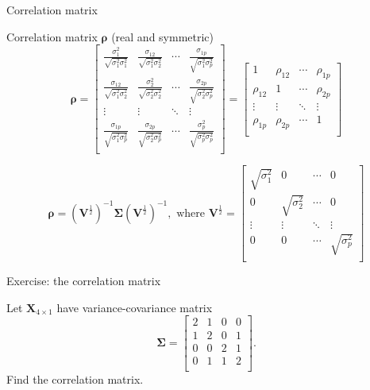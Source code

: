 \documentclass[
  ignorenonframetext,
]{beamer}
\begin{document}
\begin{frame}
\begin{block}{Correlation matrix}
\protect\hypertarget{correlation-matrix}{}
\(~\)

Correlation matrix \(\boldsymbol{\rho}\) (real and symmetric)
\[\boldsymbol{\rho}=\left[ \begin{array}{cccc}
    \frac{\sigma_{1}^2}{\sqrt{\sigma_{1}^2\sigma_{1}^2}} &
    \frac{\sigma_{12}}{\sqrt{\sigma_{1}^2\sigma_{2}^2}} &
    \cdots &
    \frac{\sigma_{1p}}{\sqrt{\sigma_{1}^2\sigma_{p}^2}}\\
    \frac{\sigma_{12}}{\sqrt{\sigma_{1}^2\sigma_{2}^2}} &
    \frac{\sigma_{2}^2}{\sqrt{\sigma_{2}^2\sigma_{2}^2}} &
    \cdots &
    \frac{\sigma_{2p}}{\sqrt{\sigma_{2}^2\sigma_{p}^2}}\\
    \vdots & \vdots & \ddots & \vdots\\
      \frac{\sigma_{1p}}{\sqrt{\sigma_{1}^2\sigma_{p}^2}} &
    \frac{\sigma_{2p}}{\sqrt{\sigma_{2}^2\sigma_{p}^2}} &
    \cdots &
    \frac{\sigma_{p}^2}{\sqrt{\sigma_{p}^2\sigma_{p}^2}}\\ \end{array}\right]=
 \left[ \begin{array}{cccc}
    1 & \rho_{12} & \cdots & \rho_{1p}\\
    \rho_{12} & 1 & \cdots & \rho_{2p}\\
    \vdots & \vdots & \ddots & \vdots\\
    \rho_{1p} & \rho_{2p} & \cdots & 1\\
\end{array}\right]\]

\[\boldsymbol{\rho}=(\boldsymbol{V}^{\frac{1}{2}})^{-1}
    \boldsymbol\Sigma(\boldsymbol{V}^{\frac{1}{2}})^{-1}, \text{   where    }
   \boldsymbol{V}^{\frac{1}{2}}=
 \left[ \begin{array}{cccc}
    \sqrt{\sigma_{1}^2} & 0& \cdots & 0\\
    0 &  \sqrt{\sigma_{2}^2}  & \cdots & 0\\
    \vdots & \vdots & \ddots & \vdots\\
    0 & 0 & \cdots &  \sqrt{\sigma_{p}^2} \\
\end{array} \right]\]
\end{block}
\end{frame}

\begin{frame}
\begin{block}{Exercise: the correlation matrix}
\protect\hypertarget{exercise-the-correlation-matrix}{}
\(~\)

Let \(\boldsymbol{X}_{4\times 1}\) have variance-covariance matrix
\[\boldsymbol\Sigma= \left[ \begin{array}{cccc} 2&1&0&0\\
      1&2&0&1\\
      0&0&2&1\\
      0&1&1&2\\
          \end{array}
          \right].\] Find the correlation matrix.
\end{block}
\end{frame}
\end{document}
